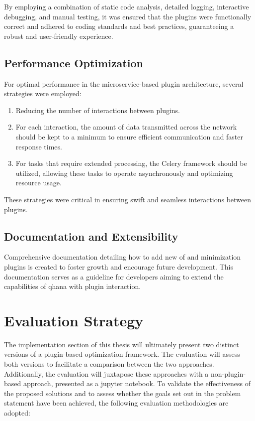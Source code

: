 \documentclass[
  a4paper,  %
  twoside,  %
  bibliography=totoc,
  headsepline,
  cleardoublepage=empty,
  parskip=half,
  draft=false
]{scrbook}
\begin{document}
By employing a combination of static code analysis, detailed logging, interactive debugging, and manual testing, it was ensured that the plugins were functionally correct and adhered to coding standards and best practices, guaranteeing a robust and user-friendly experience.


\subsection{Performance Optimization}
For optimal performance in the microservice-based plugin architecture, several strategies were employed:

\begin{enumerate}
    \item Reducing the number of interactions between plugins.
    \item For each interaction, the amount of data transmitted across the network should be kept to a minimum to ensure efficient communication and faster response times.
    \item For tasks that require extended processing, the Celery framework should be utilized, allowing these tasks to operate asynchronously and optimizing resource usage.
\end{enumerate}

These strategies were critical in ensuring swift and seamless interactions between plugins.


\subsection{Documentation and Extensibility}
Comprehensive documentation detailing how to add new \gls{of} and minimization plugins is created to foster growth and encourage future development.
This documentation serves as a guideline for developers aiming to extend the capabilities of \gls{qhana} with plugin interaction.


\section{Evaluation Strategy}
\label{sec:evaluationStrategy}

The implementation section of this thesis will ultimately present two distinct versions of a plugin-based optimization framework.
The evaluation will assess both versions to facilitate a comparison between the two approaches.
Additionally, the evaluation will juxtapose these approaches with a non-plugin-based approach, presented as a jupyter notebook.
To validate the effectiveness of the proposed solutions and to assess whether the goals set out in the problem statement have been achieved, the following evaluation methodologies are adopted:
\end{document}
